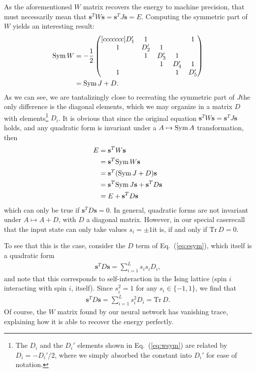 \documentclass[a4paper, twocolumn]{article}
\newcommand{\eq} [1]{Eq.\ (\ref{eq:#1})}
\newcommand{\pmat}[2]{\begin{pmatrix}[#1] #2 \end{pmatrix}}  %
\begin{document}
As the aforementioned $W$ matrix recovers the energy to machine precision, that must necessarily mean that $\mathbf{s}^TW\mathbf{s}=\mathbf{s}^TJ\mathbf{s}=E$. Computing the symmetric part of $W$ yields an interesting result:
\begin{align}
\sym W&=-\frac{1}{2}\pmat{ccccccc}{
D_1'& 1 &   &   & 1  \\
 1 &D_2'& 1 &   &    \\
   & 1 &D_3'& 1 &    \\
   &   & 1 &D_4'& 1  \\
 1 &   &   & 1 & D_5'
}\nonumber \\
&= \sym J + D. \label{eq:wsym}
\end{align}
As we can see, we are tantalizingly close to recreating the symmetric part of $J$\textemdash the only difference is the diagonal elements, which we may organize in a matrix $D$ with elements\footnote{The $D_i$ and the $D_i'$ elements shown in \eq{wsym} are related by $D_i=-D_i'/2$, where we simply absorbed the constant into $D_i'$ for ease of notation.} $D_i$. It is obvious that since the original equation $\mathbf{s}^TW\mathbf{s}=\mathbf{s}^TJ\mathbf{s}$ holds, and any quadratic form is invariant under a $A\mapsto \text{Sym}\, A$ transformation, then 
\begin{align}
E&=\mathbf{s}^T W\mathbf{s}\nonumber \\
&=\mathbf{s}^T\text{Sym}\, W\mathbf{s}\nonumber \\
&=\mathbf{s}^T(\text{Sym}\, J + D)\mathbf{s} \nonumber \\
&=\mathbf{s}^T\text{Sym}\, J \mathbf{s} + \mathbf{s}^T D\mathbf{s} \nonumber \\
&= E + \mathbf{s}^T D\mathbf{s}\label{eq:esym}
\end{align}
which can only be true if $\mathbf{s}^TD\mathbf{s}=0$. In general, quadratic forms are not invariant under $A\mapsto A+D$, with $D$ a diagonal matrix. However, in our special case\textemdash recall that the input state can only take values $s_i=\pm 1$\textemdash it is, if and only if $\text{Tr}\,D=0$. 

To see that this is the case, consider the $D$ term of \eq{esym}, which itself is a quadratic form
\begin{align}
\mathbf{s}^TD\mathbf{s}=\sum_{i=1}^L s_i s_i D_i,
\end{align}
and note that this corresponds to self-interaction in the Ising lattice (spin $i$ interacting with spin $i$, itself). Since $s_i^2=1$ for any $s_i\in\{-1,1\}$, we find that
\begin{align}
\mathbf{s}^TD\mathbf{s}=\sum_{i=1}^L s_i^2D_i = \text{Tr}\,D.
\end{align}
Of course, the $W$ matrix found by our neural network has vanishing trace, explaining how it is able to recover the energy perfectly. 
\end{document}
